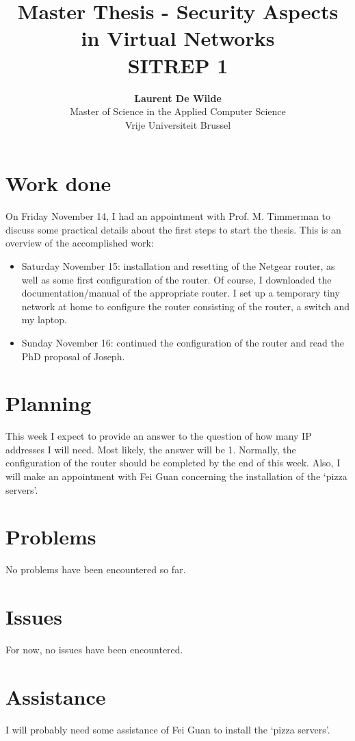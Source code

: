 \documentclass[11pt, a4paper]{article}
\title{Master Thesis -  Security Aspects in Virtual Networks\\ \textbf{SITREP 1}}
\author{\textbf{Laurent De Wilde} \\ Master of Science in the Applied Computer Science \\ Vrije Universiteit Brussel}
\begin{document}
\maketitle

\section{Work done}

On Friday November 14, I had an appointment with Prof. M. Timmerman to discuss some practical details about the first steps to start the thesis. This is an overview of the accomplished work:
\begin{itemize}
\item Saturday November 15: installation and resetting of the Netgear router, as well as some first configuration of the router. Of course, I downloaded the documentation/manual of the appropriate router. I set up a temporary tiny network at home to configure the router consisting of the router, a switch and my laptop.
\item Sunday November 16: continued the configuration of the router and read the PhD proposal of Joseph.
\end{itemize}

\section{Planning}

This week I expect to provide an answer to the question of how many IP addresses I will need. Most likely, the answer will be 1. Normally, the configuration of the router should be completed by the end of this week. Also, I will make an appointment with Fei Guan concerning the installation of the `pizza servers'.

\section{Problems}

No problems have been encountered so far.

\section{Issues}

For now, no issues have been encountered.

\section{Assistance}

I will probably need some assistance of Fei Guan to install the `pizza servers'.
\end{document}
